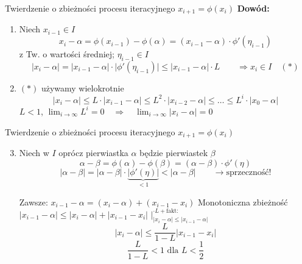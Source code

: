 \begin{frame}{Twierdzenie o zbieżności procesu iteracyjnego $x_{i+1} = \phi(x_{i})$}
	\textbf{Dowód:}
	\begin{enumerate}
		\item Niech $x_{i-1} \in I$
		\[
			x_{i} - \alpha = \phi(x_{i-1}) - \phi(\alpha) = (x_{i-1} - \alpha) \cdot \phi'(\eta_{i-1})
		\]
		z Tw. o wartości średniej; $\eta_{i-1} \in I$
		\[
			\lvert x_{i} - \alpha \rvert = \lvert x_{i-1} - \alpha \rvert \cdot \lvert \phi'(\eta_{i-1}) \rvert \leq \lvert x_{i-1} - \alpha \rvert \cdot L \qquad \Rightarrow x_{i} \in I \quad(*)
		\]
		
		\item $(*)$ używamy wielokrotnie
		\[
			\lvert x_{i} - \alpha \rvert \leq L \cdot \lvert x_{i-1} - \alpha \rvert \leq L^{2} \cdot \lvert x_{i-2} - \alpha \rvert \leq \ldots \leq L^{i} \cdot \lvert x_{0} - \alpha \rvert
		\]
		$L < 1$, $\lim_{i \rightarrow \infty} L^{i} = 0 \quad \Rightarrow \quad \lim_{i \rightarrow \infty} \lvert x_{i} - \alpha \rvert = 0$
	\end{enumerate}
\end{frame}
\begin{frame}{Twierdzenie o zbieżności procesu iteracyjnego $x_{i+1} = \phi(x_{i})$}
	\begin{enumerate}
		\setcounter{enumi}{2}
		\item Niech w $I$ oprócz pierwiastka $\alpha$ będzie pierwiastek $\beta$
		\[
			\alpha - \beta = \phi(\alpha) - \phi(\beta) = (\alpha - \beta) \cdot \phi'(\eta)
		\]
		\[
			\lvert \alpha - \beta \rvert = \lvert \alpha - \beta \rvert \cdot \underbrace{\lvert \phi'(\eta) \rvert}_{< 1} < \lvert \alpha - \beta \rvert \qquad \rightarrow \text{sprzeczność!}
		\]
		
		Zawsze: $x_{i-1} - \alpha = (x_{i} - \alpha) + (x_{i-1} - x_{i})$\linebreak
		Monotoniczna zbieżność\linebreak
		$\lvert x_{i-1} - \alpha \rvert \leq \lvert x_{i} - \alpha \rvert + \lvert x_{i-1} - x_{i} \rvert$ $\vert^{\cdot L + \text{fakt:}}_{\lvert x_{i} - \alpha \rvert \leq \lvert x_{i-1} - \alpha \rvert}$
		\[
			\lvert x_{i} - \alpha \rvert \leq \frac{L}{1 - L} \lvert x_{i-1} - x_{i} \rvert
		\]
		\[
			\frac{L}{1 - L} < 1 \text{ dla } L < \frac{1}{2}
		\]
	\end{enumerate}
\end{frame}
